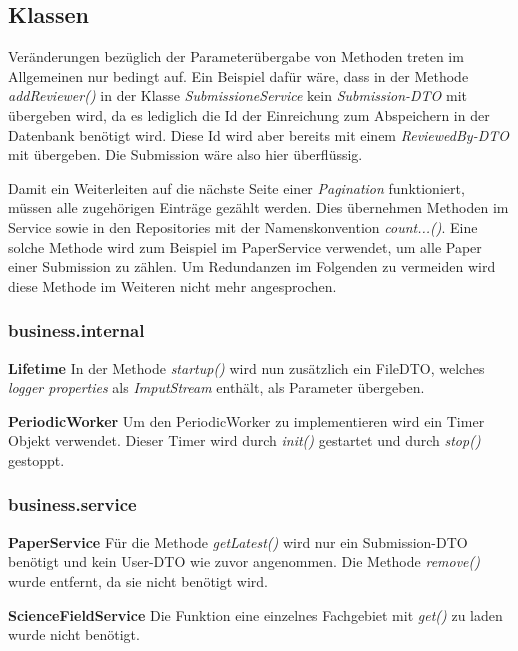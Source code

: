 \subsection{Klassen}

Veränderungen bezüglich der  Parameterübergabe von Methoden treten im Allgemeinen nur bedingt auf. Ein Beispiel dafür wäre, dass in der Methode \emph{addReviewer()} in der Klasse \emph{SubmissioneService} kein \emph{Submission-DTO} mit übergeben wird, da es lediglich die Id der Einreichung zum Abspeichern in der Datenbank benötigt wird. Diese Id wird aber bereits mit einem \emph{ReviewedBy-DTO} mit übergeben. Die Submission wäre also hier überflüssig.

Damit ein Weiterleiten auf die nächste Seite einer \emph{Pagination} funktioniert, müssen alle zugehörigen Einträge gezählt werden. Dies übernehmen Methoden im Service sowie in den Repositories mit der Namenskonvention \emph{count...()}. Eine solche Methode wird zum Beispiel im PaperService verwendet, um alle Paper einer Submission zu zählen. Um Redundanzen im Folgenden zu vermeiden wird diese Methode im Weiteren nicht mehr angesprochen.

\subsubsection{business.internal}

\textbf{Lifetime} In der Methode \emph{startup()} wird nun zusätzlich ein FileDTO, welches \emph{logger properties} als \emph{ImputStream} enthält, als Parameter übergeben.

\textbf{PeriodicWorker} Um den PeriodicWorker zu implementieren wird ein Timer Objekt verwendet. Dieser Timer wird durch \emph{init()} gestartet und durch \emph{stop()} gestoppt.

\subsubsection{business.service}

\textbf{PaperService} Für die Methode \emph{getLatest()} wird nur ein Submission-DTO benötigt und kein User-DTO wie zuvor angenommen. \newline
Die Methode \emph{remove()} wurde entfernt, da sie nicht benötigt wird.

\textbf{ScienceFieldService} Die Funktion eine einzelnes Fachgebiet mit \emph{get()} zu laden wurde nicht benötigt.

